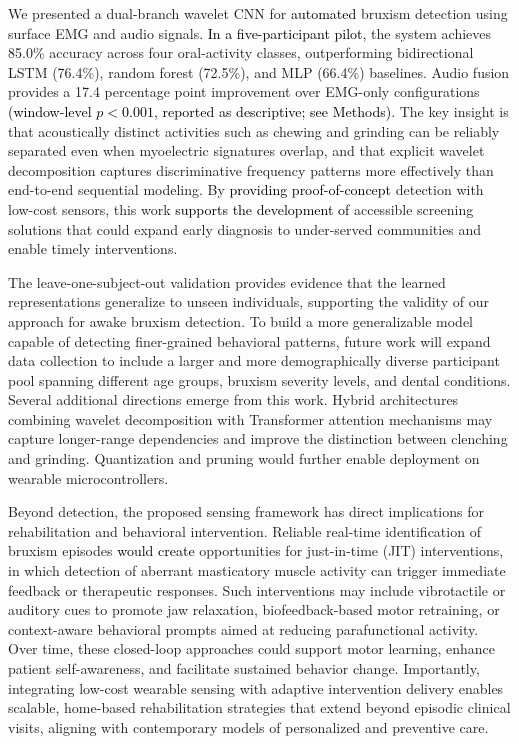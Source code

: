 \documentclass[pdflatex,sn-nature,iicol]{sn-jnl}
\newcommand{\rev}[1]{\textcolor{black}{#1}}
\begin{document}
We presented a dual-branch wavelet CNN for \rev{automated} bruxism detection using surface EMG and audio signals. \rev{In a five-participant pilot,} the system achieves 85.0\% accuracy across four oral-activity classes, outperforming bidirectional LSTM (76.4\%), random forest (72.5\%), and MLP (66.4\%) baselines. Audio fusion provides a 17.4 percentage point improvement over EMG-only configurations \rev{(window-level $p < 0.001$, reported as descriptive; see Methods)}. The key insight is that acoustically distinct activities such as chewing and grinding can be reliably separated even when myoelectric signatures overlap, and that explicit wavelet decomposition captures discriminative frequency patterns more effectively than end-to-end sequential modeling. By \rev{providing proof-of-concept} detection with low-cost sensors, this work \rev{supports the development of} accessible screening solutions that could expand early diagnosis to under-served communities and enable timely interventions.

The leave-one-subject-out validation provides evidence that the learned representations generalize to unseen individuals, supporting the validity of our approach for awake bruxism detection. To build a more generalizable model capable of detecting finer-grained behavioral patterns, future work will expand data collection to include a larger and more demographically diverse participant pool spanning different age groups, bruxism severity levels, and dental conditions. Several additional directions emerge from this work. Hybrid architectures combining wavelet decomposition with Transformer attention mechanisms may capture longer-range dependencies and improve the distinction between clenching and grinding. Quantization and pruning would further enable deployment on wearable microcontrollers.

Beyond detection, the proposed sensing framework has direct implications for rehabilitation and behavioral intervention. Reliable real-time identification of bruxism episodes \rev{would create} opportunities for just-in-time (JIT) interventions, in which detection of aberrant masticatory muscle activity can trigger immediate feedback or therapeutic responses. Such interventions may include vibrotactile or auditory cues to promote jaw relaxation, biofeedback-based motor retraining, or context-aware behavioral prompts aimed at reducing parafunctional activity. Over time, these closed-loop approaches could support motor learning, enhance patient self-awareness, and facilitate sustained behavior change. Importantly, integrating low-cost wearable sensing with adaptive intervention delivery enables scalable, home-based rehabilitation strategies that extend beyond episodic clinical visits, aligning with contemporary models of personalized and preventive care.
\end{document}
